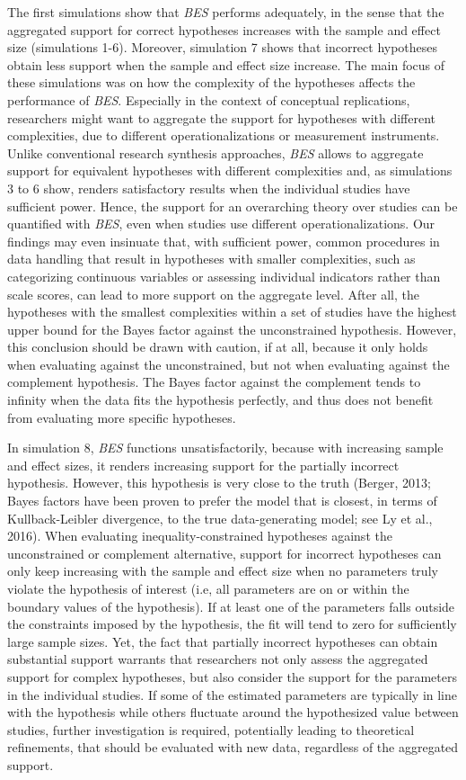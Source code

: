 \documentclass[
]{interact}
\begin{document}
The first simulations show that \emph{BES} performs adequately, in the
sense that the aggregated support for correct hypotheses increases with
the sample and effect size (simulations 1-6). Moreover, simulation 7
shows that incorrect hypotheses obtain less support when the sample and
effect size increase. The main focus of these simulations was on how the
complexity of the hypotheses affects the performance of \emph{BES}.
Especially in the context of conceptual replications, researchers might
want to aggregate the support for hypotheses with different
complexities, due to different operationalizations or measurement
instruments. Unlike conventional research synthesis approaches,
\emph{BES} allows to aggregate support for equivalent hypotheses with
different complexities and, as simulations 3 to 6 show, renders
satisfactory results when the individual studies have sufficient power.
Hence, the support for an overarching theory over studies can be
quantified with \emph{BES}, even when studies use different
operationalizations. Our findings may even insinuate that, with
sufficient power, common procedures in data handling that result in
hypotheses with smaller complexities, such as categorizing continuous
variables or assessing individual indicators rather than scale scores,
can lead to more support on the aggregate level. After all, the
hypotheses with the smallest complexities within a set of studies have
the highest upper bound for the Bayes factor against the unconstrained
hypothesis. However, this conclusion should be drawn with caution, if at
all, because it only holds when evaluating against the unconstrained,
but not when evaluating against the complement hypothesis. The Bayes
factor against the complement tends to infinity when the data fits the
hypothesis perfectly, and thus does not benefit from evaluating more
specific hypotheses.

In simulation 8, \emph{BES} functions unsatisfactorily, because with
increasing sample and effect sizes, it renders increasing support for
the partially incorrect hypothesis. However, this hypothesis is very
close to the truth (Berger, 2013; Bayes factors have been proven to
prefer the model that is closest, in terms of Kullback-Leibler
divergence, to the true data-generating model; see Ly et al., 2016).
When evaluating inequality-constrained hypotheses against the
unconstrained or complement alternative, support for incorrect
hypotheses can only keep increasing with the sample and effect size when
no parameters truly violate the hypothesis of interest (i.e, all
parameters are on or within the boundary values of the hypothesis). If
at least one of the parameters falls outside the constraints imposed by
the hypothesis, the fit will tend to zero for sufficiently large sample
sizes. Yet, the fact that partially incorrect hypotheses can obtain
substantial support warrants that researchers not only assess the
aggregated support for complex hypotheses, but also consider the support
for the parameters in the individual studies. If some of the estimated
parameters are typically in line with the hypothesis while others
fluctuate around the hypothesized value between studies, further
investigation is required, potentially leading to theoretical
refinements, that should be evaluated with new data, regardless of the
aggregated support.
\end{document}
